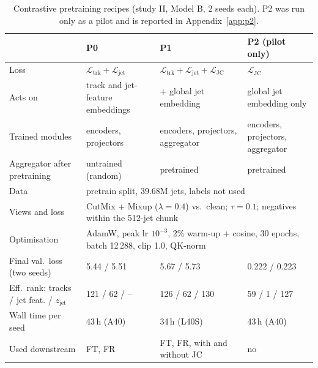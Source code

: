 \documentclass[11pt,a4paper]{article}
\newcommand{\LJC}{\mathcal{L}_{\mathrm{JC}}}
\newcommand{\Ltrk}{\mathcal{L}_{\mathrm{trk}}}
\newcommand{\Ljet}{\mathcal{L}_{\mathrm{jet}}}
\begin{document}
\begin{table}[htbp]
\centering\small
\caption{Contrastive pretraining recipes (study II, Model B, 2 seeds each).
P2 was run only as a pilot and is reported in Appendix~\ref{app:p2}.}
\label{tab:pretrain}
\begin{tabular}{p{3.6cm}p{3.7cm}p{3.9cm}p{3.7cm}}
\toprule
 & \textbf{P0} & \textbf{P1} & P2 (pilot only) \\
\midrule
Loss & $\Ltrk+\Ljet$ & $\Ltrk+\Ljet+\LJC$ & $\LJC$ \\
Acts on & track and jet-feature embeddings & + global jet embedding & global jet embedding only \\
Trained modules & encoders, projectors & encoders, projectors, aggregator & encoders, projectors, aggregator \\
Aggregator after pretraining & untrained (random) & pretrained & pretrained \\
\midrule
Data & \multicolumn{3}{p{11.9cm}}{pretrain split, 39.68M jets, labels not used} \\
Views and loss & \multicolumn{3}{p{11.9cm}}{CutMix + Mixup ($\lambda=0.4$) vs.\ clean; $\tau=0.1$; negatives within the 512-jet chunk} \\
Optimisation & \multicolumn{3}{p{11.9cm}}{AdamW, peak lr $10^{-3}$, 2\% warm-up + cosine, 30 epochs, batch 12\,288, clip 1.0, QK-norm} \\
\midrule
Final val.\ loss (two seeds) & 5.44 / 5.51 & 5.67 / 5.73 & 0.222 / 0.223 \\
Eff.\ rank: tracks / jet feat. / $z_{\mathrm{jet}}$ & 121 / 62 / -- & 126 / 62 / 130 & 59 / 1 / 127 \\
Wall time per seed & 43\,h (A40) & 34\,h (L40S) & 43\,h (A40) \\
Used downstream & FT, FR & FT, FR, with and without JC & no \\
\bottomrule
\end{tabular}
\end{table}
\end{document}
